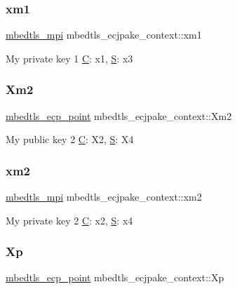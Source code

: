 \subsubsection{\texorpdfstring{xm1}{xm1}}
{\footnotesize\ttfamily \hyperlink{structmbedtls__mpi}{mbedtls\+\_\+mpi} mbedtls\+\_\+ecjpake\+\_\+context\+::xm1}

My private key 1 \hyperlink{struct_c}{C}\+: x1, \hyperlink{struct_s}{S}\+: x3 \mbox{\label{structmbedtls__ecjpake__context_a55676584cea41d167008b594748ca0d5}} 
\subsubsection{\texorpdfstring{Xm2}{Xm2}}
{\footnotesize\ttfamily \hyperlink{structmbedtls__ecp__point}{mbedtls\+\_\+ecp\+\_\+point} mbedtls\+\_\+ecjpake\+\_\+context\+::\+Xm2}

My public key 2 \hyperlink{struct_c}{C}\+: X2, \hyperlink{struct_s}{S}\+: X4 \mbox{\label{structmbedtls__ecjpake__context_ae1769cd75e437d673b4a49fc0d01bafc}} 
\subsubsection{\texorpdfstring{xm2}{xm2}}
{\footnotesize\ttfamily \hyperlink{structmbedtls__mpi}{mbedtls\+\_\+mpi} mbedtls\+\_\+ecjpake\+\_\+context\+::xm2}

My private key 2 \hyperlink{struct_c}{C}\+: x2, \hyperlink{struct_s}{S}\+: x4 \mbox{\label{structmbedtls__ecjpake__context_a8f830784980935408a08b5a7e37f7a88}} 
\subsubsection{\texorpdfstring{Xp}{Xp}}
{\footnotesize\ttfamily \hyperlink{structmbedtls__ecp__point}{mbedtls\+\_\+ecp\+\_\+point} mbedtls\+\_\+ecjpake\+\_\+context\+::\+Xp}

